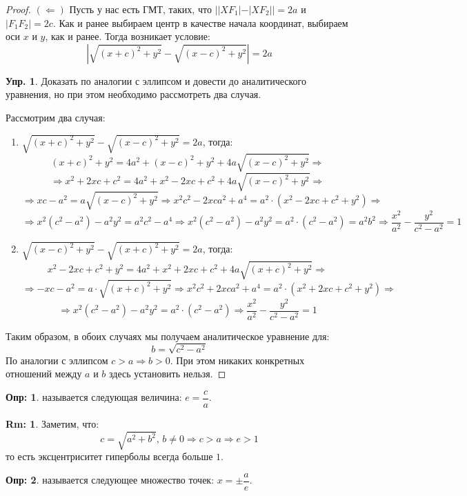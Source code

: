 \documentclass[12pt]{article}
\theoremstyle{definition}
\newtheorem{defn}{Опр:}
\newtheorem{rem}{Rm:}
\newtheorem{exrc}{Упр.}
\begin{document}
\begin{proof}
	$(\Leftarrow)$ Пусть у нас есть ГМТ, таких, что $||XF_1| - |XF_2|| = 2a$ и $|F_1F_2| = 2c$. Как и ранее выбираем центр в качестве начала координат, выбираем оси $x$ и $y$, как и ранее. Тогда возникает условие:
	$$
		\left|\sqrt{(x + c)^2 + y^2 } - \sqrt{(x-c)^2 + y^2}\right| = 2a
	$$
	\begin{exrc}
		Доказать по аналогии с эллипсом и довести до аналитического уравнения, но при этом необходимо рассмотреть два случая.
	\end{exrc}
	Рассмотрим два случая:
	\begin{enumerate}[label=\arabic*)]
		\item $\sqrt{(x + c)^2 + y^2 } - \sqrt{(x-c)^2 + y^2} = 2a$, тогда:
		$$
			(x + c)^2 + y^2 = 4a^2 + (x-c)^2 + y^2 + 4a\sqrt{(x-c)^2 + y^2} \Rightarrow 
		$$
		$$	
			\Rightarrow x^2 + 2xc + c^2 = 4a^2 + x^2 - 2xc + c^2 + 4a\sqrt{(x-c)^2 + y^2} \Rightarrow
		$$
		$$
			\Rightarrow xc - a^2 = a\sqrt{(x-c)^2 + y^2} \Rightarrow x^2c^2 - 2xca^2 + a^4 = a^2{\cdot}\left(x^2 - 2xc + c^2 + y^2\right) \Rightarrow
		$$
		$$
			\Rightarrow x^2(c^2 - a^2)  -a^2y^2 = a^2c^2 - a^4 \Rightarrow x^2(c^2 - a^2) - a^2y^2 = a^2{\cdot}(c^2 - a^2) = a^2b^2 \Rightarrow \dfrac{x^2}{a^2}- \dfrac{y^2}{c^2 - a^2} = 1
		$$
		\item $\sqrt{(x-c)^2 + y^2} - \sqrt{(x + c)^2 + y^2 } = 2a$, тогда:
		$$
			x^2 - 2xc + c^2 + y^2 = 4a^2 + x^2 + 2xc + c^2 + 4a\sqrt{(x + c)^2 + y^2 } \Rightarrow 
		$$
		$$
			\Rightarrow -xc - a^2 = a{\cdot}\sqrt{(x + c)^2 + y^2} \Rightarrow x^2c^2 + 2xca^2 + a^4 = a^2{\cdot}\left(x^2 + 2xc + c^2 + y^2\right)  \Rightarrow
		$$
		$$
			\Rightarrow x^2(c^2 - a^2) -a^2y^2 = a^2{\cdot}(c^2 - a^2) \Rightarrow \dfrac{x^2}{a^2} - \dfrac{y^2}{c^2 - a^2} = 1
		$$
	\end{enumerate}
	Таким образом, в обоих случаях мы получаем аналитическое уравнение для: 
	$$
		b = \sqrt{c^2 - a^2}
	$$
	По аналогии с эллипсом $c > a \Rightarrow b >0$. При этом никаких конкретных отношений между $a$ и $b$ здесь установить нельзя.
\end{proof}

\begin{defn}
	 называется следующая величина: $e = \dfrac{c}{a}$.
\end{defn}
\begin{rem}
	Заметим, что:
	$$
		c = \sqrt{a^2 + b^2}, \, b \neq 0 \Rightarrow c > a \Rightarrow e > 1
	$$
	то есть эксцентриситет гиперболы всегда больше $1$.
\end{rem}
\begin{defn}
	 называется следующее множество точек: $x = \pm \dfrac{a}{e}$.
\end{defn}
\end{document}
